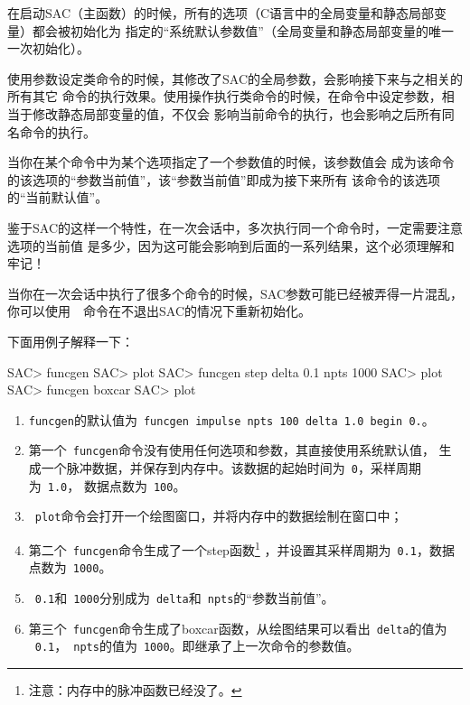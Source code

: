 在启动SAC（主函数）的时候，所有的选项（C语言中的全局变量和静态局部变量）都会被初始化为
指定的``系统默认参数值''（全局变量和静态局部变量的唯一一次初始化）。

使用参数设定类命令的时候，其修改了SAC的全局参数，会影响接下来与之相关的所有其它
命令的执行效果。使用操作执行类命令的时候，在命令中设定参数，相当于修改静态局部变量的值，不仅会
影响当前命令的执行，也会影响之后所有同名命令的执行。

当你在某个命令中为某个选项指定了一个参数值的时候，该参数值会
成为该命令的该选项的``参数当前值''，该``参数当前值''即成为接下来所有
该命令的该选项的``当前默认值''。

鉴于SAC的这样一个特性，在一次会话中，多次执行同一个命令时，一定需要注意选项的当前值
是多少，因为这可能会影响到后面的一系列结果，这个必须理解和牢记！

\begin{Tips}
当你在一次会话中执行了很多个命令的时候，SAC参数可能已经被弄得一片混乱，
你可以使用~~命令在不退出SAC的情况下重新初始化。
\end{Tips}

下面用例子解释一下：
\begin{SACCode}
SAC> funcgen
SAC> plot
SAC> funcgen step delta 0.1 npts 1000
SAC> plot
SAC> funcgen boxcar
SAC> plot
\end{SACCode}

\begin{enumerate}
\item \verb+funcgen+的默认值为~\verb+funcgen impulse npts 100 delta 1.0 begin 0.+。
\item 第一个~\verb+funcgen+命令没有使用任何选项和参数，其直接使用系统默认值，
    生成一个脉冲数据，并保存到内存中。该数据的起始时间为~\verb+0+，采样周期为~\verb+1.0+，
    数据点数为~\verb+100+。
\item ~\verb+plot+命令会打开一个绘图窗口，并将内存中的数据绘制在窗口中；
\item 第二个~\verb+funcgen+命令生成了一个step函数\footnote{注意：内存中的脉冲函数已经没了。}
    ，并设置其采样周期为~\verb+0.1+，数据点数为~\verb+1000+。
\item ~\verb+0.1+和~\verb+1000+分别成为~\verb+delta+和~\verb+npts+的``参数当前值''。
\item 第三个~\verb+funcgen+命令生成了boxcar函数，从绘图结果可以看出~\verb+delta+的值为
    ~\verb+0.1+，~\verb+npts+的值为~\verb+1000+。即继承了上一次命令的参数值。
\end{enumerate}
